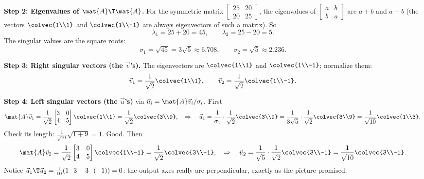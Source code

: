 \textbf{Step 2: Eigenvalues of $\mat{A}\T\mat{A}$.} For the symmetric matrix
$\begin{bmatrix} 25 & 20 \\ 20 & 25\end{bmatrix}$, the eigenvalues of
$\begin{bmatrix} a & b \\ b & a\end{bmatrix}$ are $a+b$ and $a-b$ (the vectors
$\colvec{1\\1}$ and $\colvec{1\\-1}$ are always eigenvectors of such a matrix).
So
\[
  \lambda_1 = 25 + 20 = 45, \qquad \lambda_2 = 25 - 20 = 5.
\]
The singular values are the square roots:
\[
  \sigma_1 = \sqrt{45} = 3\sqrt{5} \approx 6.708, \qquad
  \sigma_2 = \sqrt{5} \approx 2.236.
\]

\textbf{Step 3: Right singular vectors (the $\vec{v}$'s).} The eigenvectors are
$\colvec{1\\1}$ and $\colvec{1\\-1}$; normalize them:
\[
  \vec{v}_1 = \frac{1}{\sqrt2}\colvec{1\\1}, \qquad
  \vec{v}_2 = \frac{1}{\sqrt2}\colvec{1\\-1}.
\]

\textbf{Step 4: Left singular vectors (the $\vec{u}$'s)} via $\vec{u}_i =
\mat{A}\vec{v}_i / \sigma_i$. First
\[
  \mat{A}\vec{v}_1 = \frac{1}{\sqrt2}\begin{bmatrix} 3 & 0 \\ 4 & 5 \end{bmatrix}\colvec{1\\1}
  = \frac{1}{\sqrt2}\colvec{3\\9},
  \quad\Rightarrow\quad
  \vec{u}_1 = \frac{1}{\sigma_1}\cdot\frac{1}{\sqrt2}\colvec{3\\9}
  = \frac{1}{3\sqrt5}\cdot\frac{1}{\sqrt2}\colvec{3\\9}
  = \frac{1}{\sqrt{10}}\colvec{1\\3}.
\]
Check its length: $\frac{1}{\sqrt{10}}\sqrt{1+9} = 1$. Good. Then
\[
  \mat{A}\vec{v}_2 = \frac{1}{\sqrt2}\begin{bmatrix} 3 & 0 \\ 4 & 5 \end{bmatrix}\colvec{1\\-1}
  = \frac{1}{\sqrt2}\colvec{3\\-1},
  \quad\Rightarrow\quad
  \vec{u}_2 = \frac{1}{\sqrt5}\cdot\frac{1}{\sqrt2}\colvec{3\\-1}
  = \frac{1}{\sqrt{10}}\colvec{3\\-1}.
\]
Notice $\vec{u}_1\T\vec{u}_2 = \frac{1}{10}(1\cdot 3 + 3\cdot(-1)) = 0$: the
output axes really are perpendicular, exactly as the picture promised.

